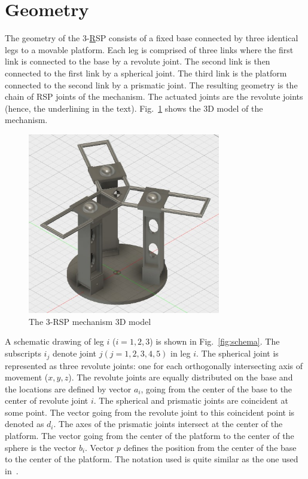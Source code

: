 \documentclass[titlepage, letterpaper, fleqn]{article}
\begin{document}

\section{Geometry}
\label{sec:geo}

The geometry of the 3-\underline{R}SP consists of a fixed base connected by three identical legs to a movable platform.
Each leg is comprised of three links where the first link is connected to the base by a revolute joint.
The second link is then connected to the first link by a spherical joint.
The third link is the platform connected to the second link by a prismatic joint.
The resulting geometry is the chain of RSP joints of the mechanism.
The actuated joints are the revolute joints (hence, the underlining in the text).
Fig.~\ref{fig:3dmodel} shows the 3D model of the mechanism.

\begin{figure}[htbp]
    \centering
    \includegraphics[width=0.75\textwidth]{fig_3dmodel}
    \caption{The 3-RSP mechanism 3D model}
    \label{fig:3dmodel}
\end{figure}

A schematic drawing of leg $i$ ($i = 1, 2, 3$) is shown in Fig.~\ref{fig:schema}.
The subscripts $i_j$ denote joint $j ( j = 1, 2, 3, 4, 5)$ in leg $i$.
The spherical joint is represented as three revolute joints:
one for each orthogonally intersecting axis of movement ($x, y, z$).
The revolute joints are equally distributed on the base and the locations are defined by vector $a_i$, going from the center of the base to the center of revolute joint $i$.
The spherical and prismatic joints are coincident at some point. The vector going from the revolute joint to this coincident point is denoted as $d_i$.
The axes of the prismatic joints intersect at the center of the platform.
The vector going from the center of the platform to the center of the sphere is the vector $b_i$.
Vector $p$ defines the position from the center of the base to the center of the platform.
The notation used is quite similar as the one used in~\cite{Rodriguez-Leal11}.
\end{document}
